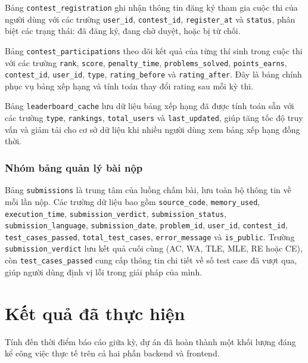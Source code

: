 \documentclass[12pt, a4paper]{report}
\begin{document}
Bảng \texttt{contest\_registration} ghi nhận thông tin đăng ký tham gia cuộc thi của người dùng với các trường \texttt{user\_id}, \texttt{contest\_id}, \texttt{register\_at} và \texttt{status}, phân biệt các trạng thái: đã đăng ký, đang chờ duyệt, hoặc bị từ chối.

Bảng \texttt{contest\_participations} theo dõi kết quả của từng thí sinh trong cuộc thi với các trường \texttt{rank}, \texttt{score}, \texttt{penalty\_time}, \texttt{problems\_solved}, \texttt{points\_earns}, \texttt{contest\_id}, \texttt{user\_id}, \texttt{type}, \texttt{rating\_before} và \texttt{rating\_after}. Đây là bảng chính phục vụ bảng xếp hạng và tính toán thay đổi rating sau mỗi kỳ thi.

Bảng \texttt{leaderboard\_cache} lưu dữ liệu bảng xếp hạng đã được tính toán sẵn với các trường \texttt{type}, \texttt{rankings}, \texttt{total\_users} và \texttt{last\_updated}, giúp tăng tốc độ truy vấn và giảm tải cho cơ sở dữ liệu khi nhiều người dùng xem bảng xếp hạng đồng thời.

\subsection{Nhóm bảng quản lý bài nộp}

Bảng \texttt{submissions} là trung tâm của luồng chấm bài, lưu toàn bộ thông tin về mỗi lần nộp. Các trường dữ liệu bao gồm \texttt{source\_code}, \texttt{memory\_used}, \texttt{execution\_time}, \texttt{submission\_verdict}, \texttt{submission\_status}, \texttt{submission\_language}, \texttt{submission\_date}, \texttt{problem\_id}, \texttt{user\_id}, \texttt{contest\_id}, \texttt{test\_cases\_passed}, \texttt{total\_test\_cases}, \texttt{error\_message} và \texttt{is\_public}. Trường \texttt{submission\_verdict} lưu kết quả cuối cùng (\ac{AC}, \ac{WA}, \ac{TLE}, \ac{MLE}, \ac{RE} hoặc \ac{CE}), còn \texttt{test\_cases\_passed} cung cấp thông tin chi tiết về số test case đã vượt qua, giúp người dùng định vị lỗi trong giải pháp của mình.

\chapter{Kết quả đã thực hiện}

Tính đến thời điểm báo cáo giữa kỳ, dự án đã hoàn thành một khối lượng đáng kể công việc thực tế trên cả hai phần backend và frontend.
\end{document}
